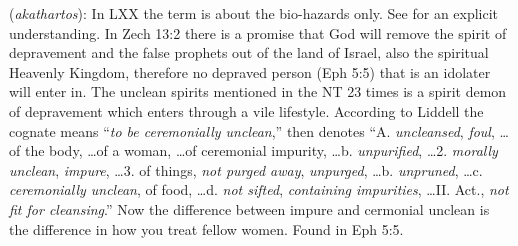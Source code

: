 \item[Depravement,]

(\textit{akathartos}):
In LXX the term is about the bio-hazards only. See  for an explicit understanding. In Zech 13:2 there is a promise that God will remove the spirit of depravement and the false prophets out of the land of Israel, also the spiritual Heavenly Kingdom, therefore no depraved person (Eph 5:5) that is an idolater will enter in. The unclean spirits mentioned in the NT 23 times is a spirit demon of depravement which enters through a vile lifestyle. According to Liddell the cognate  means ``\emph{to be ceremonially unclean},'' then  denotes ``A. \emph{uncleansed}, \emph{foul}, \ldots of the body, \ldots of a woman, \ldots of ceremonial impurity, \ldots b. \emph{unpurified}, \ldots 2. \emph{morally unclean}, \emph{impure}, \ldots 3. of things, \emph{not purged away}, \emph{unpurged}, \ldots b. \emph{unpruned}, \ldots c. \emph{ceremonially unclean}, of food, \ldots d. \emph{not sifted}, \emph{containing impurities}, \ldots II. Act., \emph{not fit for cleansing}.'' Now the difference between impure and cermonial unclean is the difference in how you treat fellow women.
Found in Eph 5:5.
